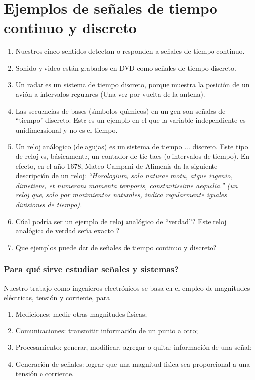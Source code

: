 \section{Ejemplos de se\~{n}ales de tiempo continuo y discreto}

\begin{enumerate}
\item Nuestros cinco sentidos detectan o responden a se\~{n}ales de
  tiempo continuo.
  
\item Sonido y video están grabados en DVD como señales de tiempo
  discreto.
  
\item Un radar es un sistema de tiempo discreto, porque muestra la
  posici\'{o}n de un avi\'{o}n a intervalos regulares (Una vez por
  vuelta de la antena).
  
\item Las secuencias de bases (s\'{\i}mbolos qu\'{\i}micos) en un gen
  son se\~{n}ales de ``tiempo'' discreto. Este es un ejemplo en el que
  la variable independiente es unidimensional y no es el tiempo.
  
\item Un reloj an\'{a}logico (de agujas) es un sistema de tiempo ...
  discreto. Este tipo de reloj es, b\'{a}sicamente,
  un contador de tic tacs (o intervalos de tiempo).  En efecto, en el
  a\~{n}o 1678, Mateo Campani de Alimenis da la siguiente
  descripci\'{o}n de un reloj: \it{``Horologium, solo naturae motu,
    atque ingenio, dimetiens, et numerans momenta temporis,
    constantissime aequalia.''} (un reloj que, solo por movimientos
  naturales, indica regularmente iguales divisiones de tiempo).

\item \textquestiondown C\'{u}al podr\'{i}a ser un ejemplo de reloj
  anal\'{o}gico de ``verdad''?  \textquestiondown Este reloj
  anal\'{o}gico de verdad ser\'{\i}a exacto ?

\item \textquestiondown Que ejemplos puede dar de se\~{n}ales de tiempo continuo y discreto?

\end{enumerate}

 \subsubsection{\textquestiondown Para qu\'{e} sirve estudiar
   se\~{n}ales y sistemas?}

 Nuestro trabajo como ingenieros electr\'{o}nicos se basa en el empleo
 de magnitudes el\'{e}ctricas, tensi\'{o}n y corriente, para
 \begin{enumerate}
 \item Mediciones: medir otras magnitudes f\'{\i}sicas;
 \item Comunicaciones: transmitir informaci\'{o}n de un punto a otro;
 \item Procesamiento: generar, modificar, agregar o quitar
   informaci\'{o}n de una se\~{n}al;
 \item Generaci\'{o}n de se\~{n}ales: lograr que una magnitud
   fis\'{\i}ca sea proporcional a una tensi\'{o}n o corriente.
 \end{enumerate}


